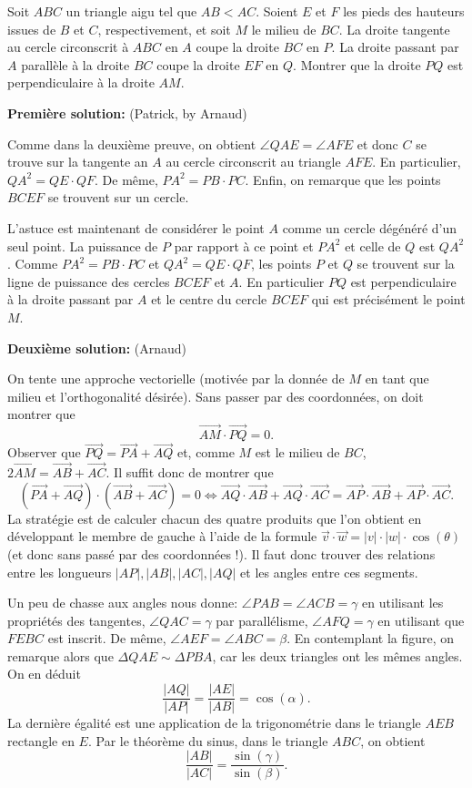 Soit $ABC$ un triangle aigu tel que $AB<AC$. Soient $E$ et $F$ les pieds des hauteurs issues de $B$ et $C$, respectivement, et soit $M$ le milieu de $BC$. La droite tangente au cercle circonscrit à $ABC$ en $A$ coupe la droite $BC$ en $P$. La droite passant par $A$ parallèle à la droite $BC$ coupe la droite $EF$ en $Q$. Montrer que la droite $PQ$ est perpendiculaire à la droite $AM$.

\textbf{Première solution:} (Patrick, by Arnaud)

Comme dans la deuxième preuve, on obtient $\angle QAE=\angle AFE$ et donc $C$ se trouve sur la tangente an $A$ au cercle circonscrit au triangle $AFE$. En particulier, $QA^2=QE\cdot QF$. De même, $PA^2=PB\cdot PC$. Enfin, on remarque que les points $BCEF$ se trouvent sur un cercle.

L'astuce est maintenant de considérer le point $A$ comme un cercle dégénéré d'un seul point. La puissance de $P$ par rapport à ce point et $PA^2$ et celle de $Q$ est $QA^2$. Comme $PA^2=PB\cdot PC$ et $QA^2=QE\cdot QF$, les points $P$ et $Q$ se trouvent sur la ligne de puissance des cercles $BCEF$ et $A$. En particulier $PQ$ est perpendiculaire à la droite passant par $A$ et le centre du cercle $BCEF$ qui est précisément le point $M$.

\textbf{Deuxième solution:} (Arnaud)

On tente une approche vectorielle (motivée par la donnée de $M$ en tant que milieu et l'orthogonalité désirée). Sans passer par des coordonnées, on doit montrer que 
\[
\vec{AM}\cdot \vec{PQ}=0.
\]
Observer que $\vec{PQ}=\vec{PA}+\vec{AQ}$ et, comme $M$ est le milieu de $BC$, $2\vec{AM}=\vec{AB}+\vec{AC}$. Il suffit donc de montrer que 
\[
(\vec{PA}+\vec{AQ})\cdot(\vec{AB}+\vec{AC})=0\Leftrightarrow \vec {AQ}\cdot \vec{AB}+\vec{AQ}\cdot\vec{AC}=\vec{AP}\cdot \vec{AB}+\vec{AP}\cdot\vec{AC}.
\]
La stratégie est de calculer chacun des quatre produits que l'on obtient en développant le membre de gauche à l'aide de la formule $\vec v\cdot \vec w=|v|\cdot|w|\cdot \cos(\theta)$ (et donc sans passé par des coordonnées !). Il faut donc trouver des relations entre les longueurs $|AP|,|AB|,|AC|,|AQ|$ et les angles entre ces segments.

Un peu de chasse aux angles nous donne: $\angle PAB=\angle ACB=\gamma$ en utilisant les propriétés des tangentes, $\angle QAC=\gamma$ par parallélisme, $\angle AFQ=\gamma$ en utilisant que $FEBC$ est inscrit. De même, $\angle AEF=\angle ABC=\beta$. En contemplant la figure, on remarque alors que $\Delta QAE\sim \Delta PBA$, car les deux triangles ont les mêmes angles. On en déduit
\[
\frac{|AQ|}{|AP|}=\frac{|AE|}{|AB|}
=\cos(\alpha).
\]
La dernière égalité est une application de la trigonométrie dans le triangle $AEB$ rectangle en $E$. Par le théorème du sinus, dans le triangle $ABC$, on obtient 
\[
\frac{|AB|}{|AC|}=\frac{\sin(\gamma)}{\sin(\beta)}.
\]


